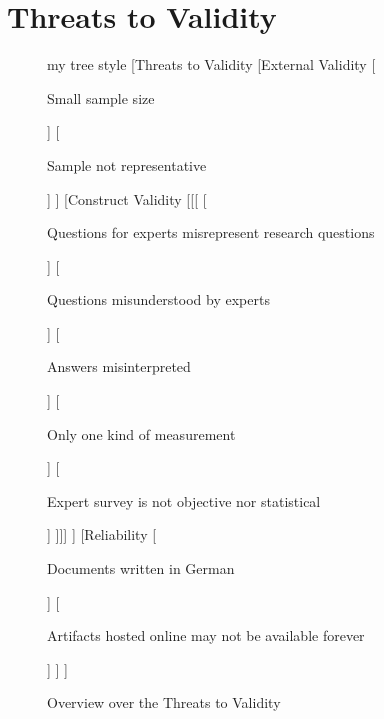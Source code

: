 \section{Threats to Validity}
\label{sec:ch5:s4}

\begin{figure}[!h]
	\centering
	\begin{forest}
	my tree style
	[Threats to Validity
      [External Validity
	    [\begin{varwidth}{0.16\linewidth}Small sample size\end{varwidth}]
	    [\begin{varwidth}{0.16\linewidth}Sample not representative\end{varwidth}]
	  ]
	  [Construct Validity 
	    [[[
	      [\begin{varwidth}{0.16\linewidth}Questions for experts misrepresent research questions\end{varwidth}]
	      [\begin{varwidth}{0.16\linewidth}Questions misunderstood by experts\end{varwidth}]
	      [\begin{varwidth}{0.16\linewidth}Answers misinterpreted\end{varwidth}]
	      [\begin{varwidth}{0.16\linewidth}Only one kind of measurement\end{varwidth}]
	      [\begin{varwidth}{0.16\linewidth}Expert survey is not objective nor statistical\end{varwidth}]
	    ]]]
	  ]
	  [Reliability
	      [\begin{varwidth}{0.16\linewidth}Documents written in German\end{varwidth}]
	      [\begin{varwidth}{0.16\linewidth}Artifacts hosted online may not be available forever\end{varwidth}]
	  ]
	]
	\end{forest}
  
	\caption{Overview over the Threats to Validity}
	\label{fig:threatsToValididty}
\end{figure}

